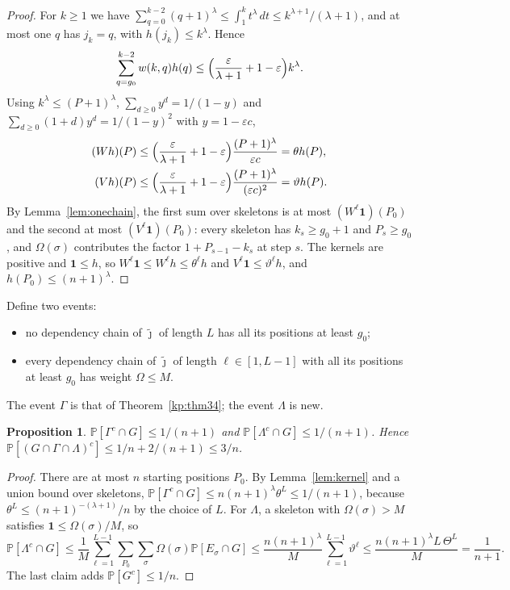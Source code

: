 \documentclass[11pt]{amsart}
\newtheorem{proposition}[theorem]{Proposition}
\theoremstyle{definition}
\theoremstyle{remark}
\newcommand{\eps}{\varepsilon}
\newcommand{\jt}{\tilde{\jmath}}
\newcommand{\PP}{\mathbb{P}}
\begin{document}
\begin{proof}
For $k\ge1$ we have $\sum_{q=0}^{k-2}(q+1)^\lambda\le\int_1^kt^\lambda\,dt\le k^{\lambda+1}/(\lambda+1)$,
and at most one $q$ has $j_k=q$, with $h(j_k)\le k^\lambda$. Hence
\[
\sum_{q=g_0}^{k-2}w(k,q)h(q)\le\Bigl(\frac{\eps}{\lambda+1}+1-\eps\Bigr)k^\lambda .
\]
Using $k^\lambda\le(P+1)^\lambda$, $\sum_{d\ge0}y^d=1/(1-y)$ and $\sum_{d\ge0}(1+d)y^d=1/(1-y)^2$
with $y=1-\eps c$,
\begin{align*}
(Wh)(P)&\le\Bigl(\frac{\eps}{\lambda+1}+1-\eps\Bigr)\frac{(P+1)^\lambda}{\eps c}=\theta h(P),\\
(Vh)(P)&\le\Bigl(\frac{\eps}{\lambda+1}+1-\eps\Bigr)\frac{(P+1)^\lambda}{(\eps c)^2}=\vartheta h(P).
\end{align*}
By Lemma~\ref{lem:onechain}, the first sum over skeletons is at most $(W^\ell\mathbf 1)(P_0)$ and
the second at most $(V^\ell\mathbf 1)(P_0)$: every skeleton has $k_s\ge g_0+1$ and $P_s\ge g_0$, and
$\Omega(\sigma)$ contributes the factor $1+P_{s-1}-k_s$ at step $s$. The kernels are positive and
$\mathbf 1\le h$, so $W^\ell\mathbf 1\le W^\ell h\le\theta^\ell h$ and
$V^\ell\mathbf 1\le\vartheta^\ell h$, and $h(P_0)\le(n+1)^\lambda$.
\end{proof}

Define two events:
\begin{itemize}[leftmargin=2.2em]
\item[$\Gamma$:] no dependency chain of $\jt$ of length $L$ has all its positions at least $g_0$;
\item[$\Lambda$:] every dependency chain of $\jt$ of length $\ell\in[1,L-1]$ with all its positions
at least $g_0$ has weight $\Omega\le M$.
\end{itemize}
The event $\Gamma$ is that of Theorem~\ref{kp:thm34}; the event $\Lambda$ is new.

\begin{proposition}\label{prop:events}
$\PP[\Gamma^c\cap G]\le 1/(n+1)$ and $\PP[\Lambda^c\cap G]\le1/(n+1)$. Hence
$\PP[(G\cap\Gamma\cap\Lambda)^c]\le 1/n+2/(n+1)\le 3/n$.
\end{proposition}

\begin{proof}
There are at most $n$ starting positions $P_0$. By Lemma~\ref{lem:kernel} and a union bound over
skeletons, $\PP[\Gamma^c\cap G]\le n(n+1)^\lambda\theta^L\le1/(n+1)$, because
$\theta^L\le(n+1)^{-(\lambda+1)}/n$ by the choice of $L$. For $\Lambda$, a skeleton with
$\Omega(\sigma)>M$ satisfies $\mathbf 1\le\Omega(\sigma)/M$, so
\[
\PP[\Lambda^c\cap G]\le\frac1M\sum_{\ell=1}^{L-1}\sum_{P_0}\sum_{\sigma}\Omega(\sigma)\PP[E_\sigma\cap G]
\le\frac{n(n+1)^\lambda}{M}\sum_{\ell=1}^{L-1}\vartheta^\ell\le\frac{n(n+1)^\lambda L\,\Theta^{L}}{M}=\frac1{n+1}.
\]
The last claim adds $\PP[G^c]\le1/n$.
\end{proof}
\end{document}
